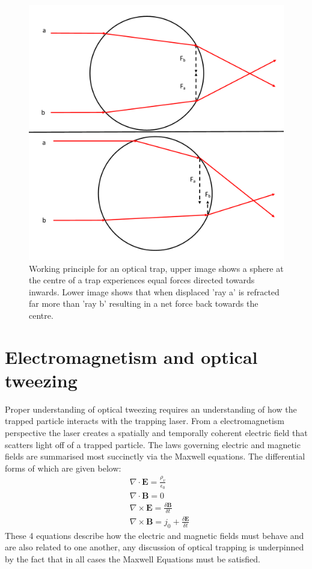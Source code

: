 \begin{figure}[h]
	\centering
	\includegraphics[width=0.65\linewidth]{ot_working_principal.png}
	\caption{Working principle for an optical trap, upper image shows a sphere at the centre of a trap experiences equal forces directed towards inwards. Lower image shows that when displaced 'ray a' is refracted far more than 'ray b' resulting in a net force back towards the centre.}
\end{figure}

\section{Electromagnetism and optical tweezing}
Proper understanding of optical tweezing requires an understanding of how the trapped particle interacts with the trapping laser. From a electromagnetism perspective the laser creates a spatially and temporally coherent electric field that scatters light off of a trapped particle. The laws governing electric and magnetic fields are summarised most succinctly via the Maxwell equations. The differential forms of which are given below:
\begin{align}
	&\nabla \cdot \mathbf{E} = \frac{\rho_ v}{\epsilon_0} \\
	&\nabla \cdot \mathbf{B} = 0 \\
	&\nabla \times \mathbf{E}  = \frac{\delta \mathbf{B}}{\delta t} \\
	&\nabla \times \mathbf{B} = j_0 +\frac{\delta \mathbf{E}}{\delta t}    
\end{align}
These 4 equations describe how the electric and magnetic fields must behave and are also related to one another, any discussion of optical trapping is underpinned by the fact that in all cases the Maxwell Equations must be satisfied. 

